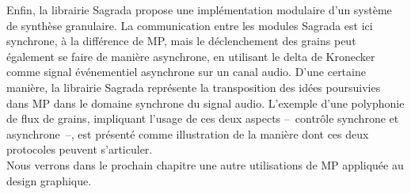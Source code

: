 \indent Enfin, la librairie Sagrada propose une implémentation modulaire d'un système de synthèse granulaire. La communication entre les modules Sagrada est ici synchrone, à la différence de MP, mais le déclenchement des grains peut également se faire de manière asynchrone, en utilisant le delta de Kronecker comme signal événementiel asynchrone sur un canal audio. D'une certaine manière, la librairie Sagrada représente la transposition des idées poursuivies dans MP dans le domaine synchrone du signal audio. L'exemple d'une polyphonie de flux de grains, impliquant l'usage de ces deux aspects --~contrôle synchrone et asynchrone~--, est présenté comme illustration de la manière dont ces deux protocoles peuvent s'articuler.\\
\indent Nous verrons dans le prochain chapitre une autre utilisations de MP appliquée au design graphique.









